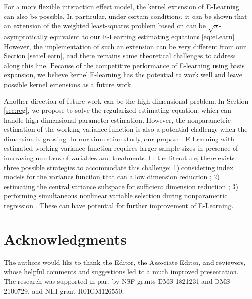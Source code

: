 \documentclass[11pt]{article}
\theoremstyle{definition}
\theoremstyle{remark}
\begin{document}
For a more flexible interaction effect model, the kernel extension of E-Learning can also be possible. In particular, under certain conditions, it can be shown that an extension of the weighted least-squares problem based on \citet{kennedy2020optimal} can be $ \sqrt{n} $-asymptotically equivalent to our E-Learning estimating equations \eqref{eq:eLearn}. However, the implementation of such an extension can be very different from our Section \ref{sec:eLearn}, and there remains some theoretical challenges to address along this line. Because of the competitive performance of E-learning using basis expansion, we believe kernel E-learning has the potential to work well and leave possible kernel extensions  as a future work.

Another direction of future work can be the high-dimensional problem. In Section \ref{sec:reg}, we propose to solve the regularized estimating equation, which can handle high-dimensional parameter estimation. However, the nonparametric estimation of the working variance function is also a potential challenge when the dimension is growing. In our simulation study, our proposed E-Learning with estimated working variance function requires larger sample sizes in presence of increasing numbers of variables and treatments. In the literature, there exists three possible strategies to accommodate this challenge: 1) considering index models for the variance function that can allow dimension reduction \citep{zhu2013semiparametric,lian2015variance}; 2) estimating the central variance subspace for sufficient dimension reduction \citep{zhu2009dimension,luo2014efficient,ma2019semiparametric}; 3) performing simultaneous nonlinear variable selection during nonparametric regression \citep{lin2006component,lafferty2008rodeo,zhang2011linear,allen2013automatic}. These can have potential for further improvement of E-Learning.

\section*{Acknowledgments}

The authors would like to thank the Editor, the Associate Editor, and reviewers, whose helpful comments and suggestions led to a much improved presentation. The research was supported in part by NSF grants DMS-1821231 and  DMS-2100729, and NIH grant R01GM126550.

\singlespacing


\end{document}
